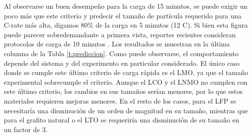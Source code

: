 \begin{table}[h!]
    \centering
    \caption{Tamaño experimental y valores predichos para cargar el 80\% del
    electrodo en 15 y 5 minutos.} 
    \setlength\extrarowheight{2pt}
    \label{t:prediccion}
\end{table}

Al observarse un buen desempeño para la carga de 15 minutos, se puede exigir un 
poco más que este criterio y predecir el tamaño de partícula requerido para una
C-rate más alta, digamos 80\% de la carga en 5 minutos (12 C). Si bien esta figura
puede parecer sobredemandante a primera vista, reportes recientes consideran 
protocolos de carga de 10 minutos \cite{mattis2021, attia2020}. Los resultados
se muestran en la última columna de la Tabla \ref{t:prediccion}. Como puede 
observarse, el comportamiento depende del sistema y del experimento en particular
considerado. El único caso donde se cumple este último criterio de carga rápida 
es el LMO, ya que el tamaño experimental sobrecumple el criterio. Aunque el LCO 
y el LNMO no cumplen con este último criterio, los cambios en sus tamaños serían
menores, por lo que estos materiales requieren mejoras menores. En el resto de 
los casos, para el LFP se necesitaría una disminución de un orden de magnitud 
en su tamaño, mientras que para el grafito natural o el LTO se requeriría una
disminución de su tamaño en un factor de 3.
